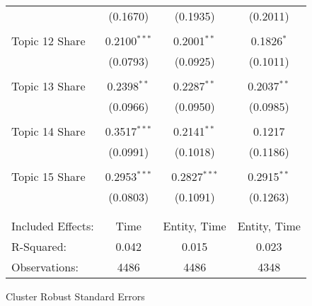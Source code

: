 \begin{center}
\begin{tabular}{lccc}
 & (0.1670)& (0.1935)& (0.2011)\\ 
\\Topic 12 Share & 0.2100$^{***}$ & 0.2001$^{**}$ & 0.1826$^{*}$ \\
 & (0.0793)& (0.0925)& (0.1011)\\ 
\\Topic 13 Share & 0.2398$^{**}$ & 0.2287$^{**}$ & 0.2037$^{**}$ \\
 & (0.0966)& (0.0950)& (0.0985)\\ 
\\Topic 14 Share & 0.3517$^{***}$ & 0.2141$^{**}$ & 0.1217 \\
 & (0.0991)& (0.1018)& (0.1186)\\ 
\\Topic 15 Share & 0.2953$^{***}$ & 0.2827$^{***}$ & 0.2915$^{**}$ \\
 & (0.0803)& (0.1091)& (0.1263)\\ 
\hline \\[-1.8ex]
 \\ Included Effects:  & Time & Entity, Time & Entity, Time\\ R-Squared:  & 0.042&0.015&0.023\\ Observations:  & 4486&4486&4348\end{tabular}
\end{center}Cluster Robust Standard Errors